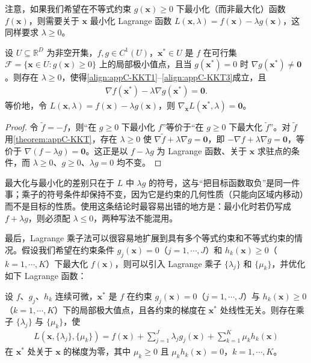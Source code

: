\documentclass[../main.tex]{subfiles}
\begin{document}
注意，如果我们希望在不等式约束 $g(\bm{x})\geqslant0$ 下最小化（而非最大化）函数 $f(\bm{x})$，则需要关于 $\bm{x}$ 最小化 Lagrange 函数 $L(\bm{x},\lambda)=f(\bm{x})-\lambda g(\bm{x})$，这同样要求 $\lambda\geqslant0$。

\begin{proposition}\label{proposition:appC-最小化KKT}
设 $U\subseteq\mathbb{R}^{D}$ 为非空开集，$f,g\in C^{1}(U)$，$\bm{x}^{*}\in U$ 是 $f$ 在可行集 $\mathcal{F}=\{\bm{x}\in U:g(\bm{x})\geqslant0\}$ 上的局部极小值点，且当 $g(\bm{x}^{*})=0$ 时 $\nabla g(\bm{x}^{*})\neq\bm{0}$。则存在 $\lambda\geqslant0$，使得\eqref{align:appC-KKT1}--\eqref{align:appC-KKT3}成立，且
\begin{align*}
  \nabla f(\bm{x}^{*})-\lambda\nabla g(\bm{x}^{*})=\bm{0}.
\end{align*}
等价地，令 $L(\bm{x},\lambda)=f(\bm{x})-\lambda g(\bm{x})$，则 $\nabla_{\bm{x}}L(\bm{x}^{*},\lambda)=\bm{0}$。
\end{proposition}

\begin{proof}
令 $\tilde{f}=-f$，则“在 $g\geqslant0$ 下最小化 $f$”等价于“在 $g\geqslant0$ 下最大化 $\tilde{f}$”。对 $\tilde{f}$ 用\cref{theorem:appC-KKT}，存在 $\lambda\geqslant0$ 使 $\nabla\tilde{f}+\lambda\nabla g=\bm{0}$，即 $-\nabla f+\lambda\nabla g=\bm{0}$，等价于 $\nabla(f-\lambda g)=\bm{0}$。这正是以 $f-\lambda g$ 为 Lagrange 函数、关于 $\bm{x}$ 求驻点的条件，而 $\lambda\geqslant0$、$g\geqslant0$、$\lambda g=0$ 均不变。
\end{proof}

\begin{remark}
最大化与最小化的差别只在于 $L$ 中 $\lambda g$ 的符号，这与“把目标函数取负”是同一件事；乘子的符号条件却保持不变，因为它是约束的几何性质（只能向区域内移动）而不是目标的性质。使用这条结论时最容易出错的地方是：最小化时若仍写成 $f+\lambda g$，则必须配 $\lambda\leqslant0$，两种写法不能混用。
\end{remark}

最后，Lagrange 乘子法可以很容易地扩展到具有多个等式约束和不等式约束的情况。假设我们希望在约束条件 $g_j(\bm{x})=0$（$j=1,\cdots,J$）和 $h_k(\bm{x})\geqslant0$（$k=1,\cdots,K$）下最大化 $f(\bm{x})$，则可以引入 Lagrange 乘子 $\{\lambda_j\}$ 和 $\{\mu_k\}$，并优化如下 Lagrange 函数：
\begin{theorem}\label{theorem:appC-多约束KKT}
设 $f$、$g_j$、$h_k$ 连续可微，$\bm{x}^{*}$ 是 $f$ 在约束 $g_j(\bm{x})=0$（$j=1,\cdots,J$）与 $h_k(\bm{x})\geqslant0$（$k=1,\cdots,K$）下的局部极大值点，且各约束的梯度在 $\bm{x}^{*}$ 处线性无关。则存在乘子 $\{\lambda_j\}$ 与 $\{\mu_k\}$，使
\begin{align}
  L(\bm{x},\{\lambda_j\},\{\mu_k\})=f(\bm{x})+\sum_{j=1}^{J}\lambda_j g_j(\bm{x})+\sum_{k=1}^{K}\mu_k h_k(\bm{x})
  \label{align:appC-多约束}
\end{align}
在 $\bm{x}^{*}$ 处关于 $\bm{x}$ 的梯度为零，其中 $\mu_k\geqslant0$ 且 $\mu_k h_k(\bm{x})=0$，$k=1,\cdots,K$。
\end{theorem}
\end{document}
